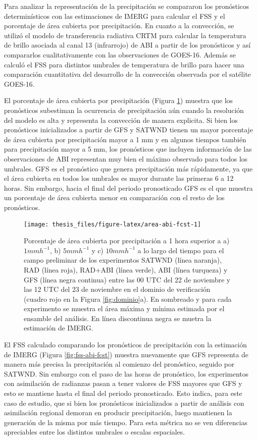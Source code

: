 \documentclass[12pt,oneside,a4paper]{reedthesis}
\begin{document}
Para analizar la representación de la precipitación se compararon los pronósticos determinísticos con las estimaciones de IMERG para calcular el FSS y el porcentaje de área cubierta por precipitación. En cuanto a la convección, se utilizó el modelo de transferencia radiativa CRTM para calcular la temperatura de brillo asociada al canal 13 (infrarrojo) de ABI a partir de los pronósticos y así compararlos cualitativamente con las observaciones de GOES-16. Además se calculó el FSS para distintos umbrales de temperatura de brillo para hacer una comparación cuantitativa del desarrollo de la convección observada por el satélite GOES-16.

El porcentaje de área cubierta por precipitación (Figura \ref{fig:area-abi-fcst}) muestra que los pronósticos subestiman la ocurrencia de precipitación aún cuando la resolución del modelo es alta y representa la convección de manera explicita. Si bien los pronósticos inicializados a partir de GFS y SATWND tienen un mayor porcentaje de área cubierta por precipitación mayor a 1 mm y en algunos tiempos también para precipitación mayor a 5 mm, los pronósticos que incluyen información de las observaciones de ABI representan muy bien el máximo observado para todos los umbrales. GFS es el pronóstico que genera precipitación más rápidamente, ya que el área cubierta en todos los umbrales es mayor durante las primeras 6 a 12 horas. Sin embargo, hacia el final del periodo pronosticado GFS es el que muestra un porcentaje de área cubierta menor en comparación con el resto de los pronósticos.


\begin{figure}
\texttt{[image: thesis\_files/figure-latex/area-abi-fcst-1]} \caption{Porcentaje de área cubierta por precipitación a 1 hora superior a a) \(1 mmh^{-1}\), b) \(5 mmh^{-1}\) y c) \(10 mmh^{-1}\) a lo largo del tiempo para el campo preliminar de los experimentos SATWND (línea naranja), RAD (línea roja), RAD+ABI (línea verde), ABI (línea turqueza) y GFS (línea negra continua) entre las 00 UTC del 22 de noviembre y las 12 UTC del 23 de noviembre en el dominio de verificación (cuadro rojo en la Figura \ref{fig:dominio}a). En sombreado y para cada experimento se muestra el área máxima y mínima estimada por el ensamble del análisis. En línea discontinua negra se muetra la estimación de IMERG.}\label{fig:area-abi-fcst}
\end{figure}
El FSS calculado comparando los pronósticos de precipitación con la estimación de IMERG (Figura \ref{fig:fss-abi-fcst}) muestra nuevamente que GFS representa de manera más precisa la precipitación al comienzo del pronóstico, seguido por SATWND. Sin embargo con el paso de las horas de pronóstico, los experimentos con asimilación de radianzas pasan a tener valores de FSS mayores que GFS y esto se mantiene hasta el final del periodo pronosticado. Esto indica, para este caso de estudio, que si bien los pronósticos inicializados a partir de análisis con asimilación regional demoran en producir precipitación, luego mantienen la generación de la misma por más tiempo. Para esta métrica no se ven diferencias apreciables entre los distintos umbrales o escalas espaciales.
\end{document}
